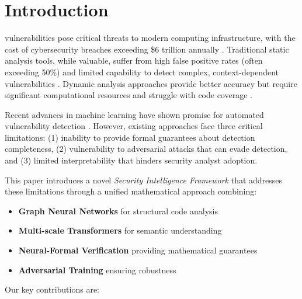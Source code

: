\documentclass[10pt,journal,compsoc]{IEEEtran}
\begin{document}
\maketitle

\IEEEdisplaynontitleabstractindextext
\IEEEpeerreviewmaketitle

\section{Introduction}
 vulnerabilities pose critical threats to modern computing infrastructure, with the cost of cybersecurity breaches exceeding \$6 trillion annually \cite{cybersecurity2023}. Traditional static analysis tools, while valuable, suffer from high false positive rates (often exceeding 50\%) and limited capability to detect complex, context-dependent vulnerabilities \cite{johnson2013static}. Dynamic analysis approaches provide better accuracy but require significant computational resources and struggle with code coverage \cite{rawat2017vuzzer}.

Recent advances in machine learning have shown promise for automated vulnerability detection \cite{russell2018automated,li2018vuldeepecker}. However, existing approaches face three critical limitations: (1) inability to provide formal guarantees about detection completeness, (2) vulnerability to adversarial attacks that can evade detection, and (3) limited interpretability that hinders security analyst adoption.

This paper introduces a novel \textit{Security Intelligence Framework} that addresses these limitations through a unified mathematical approach combining:

\begin{itemize}
\item \textbf{Graph Neural Networks} for structural code analysis
\item \textbf{Multi-scale Transformers} for semantic understanding
\item \textbf{Neural-Formal Verification} providing mathematical guarantees
\item \textbf{Adversarial Training} ensuring robustness
\end{itemize}

Our key contributions are:
\end{document}
